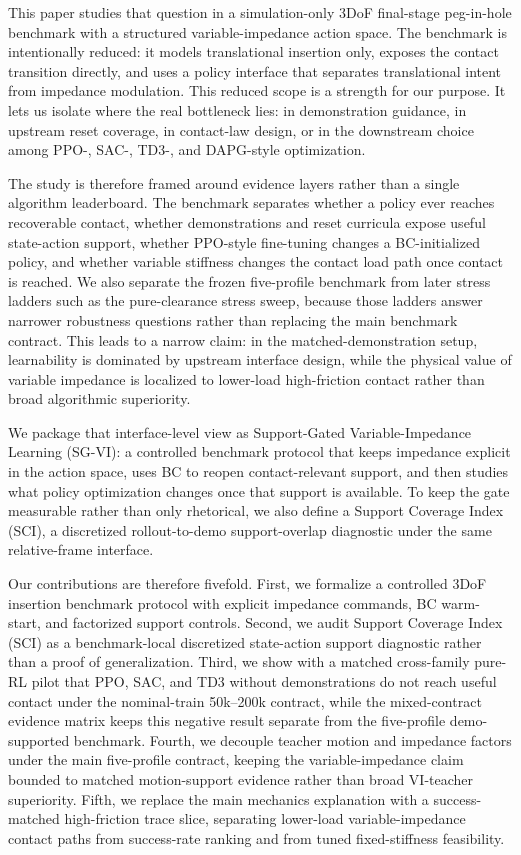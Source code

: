﻿\documentclass[11pt]{article}
\begin{document}
This paper studies that question in a simulation-only 3DoF final-stage peg-in-hole benchmark with
a structured variable-impedance action space. The benchmark is intentionally reduced: it models
translational insertion only, exposes the contact transition directly, and uses a policy interface
that separates translational intent from impedance modulation. This reduced scope is a strength for
our purpose. It lets us isolate where the real bottleneck lies: in demonstration guidance, in
upstream reset coverage, in contact-law design, or in the downstream choice among PPO-, SAC-,
TD3-, and DAPG-style optimization.

The study is therefore framed around evidence layers rather than a single algorithm leaderboard.
The benchmark separates whether a policy ever reaches recoverable contact, whether demonstrations
and reset curricula expose useful state-action support, whether PPO-style fine-tuning changes a
BC-initialized policy, and whether variable stiffness changes the contact load path once contact is
reached. We also separate the frozen five-profile benchmark from later stress ladders such as the
pure-clearance stress sweep, because those ladders answer narrower robustness questions rather
than replacing the main benchmark contract. This leads to a narrow claim: in the matched-demonstration setup, learnability is dominated by upstream interface design, while the physical
value of variable impedance is localized to lower-load high-friction contact rather than broad
algorithmic superiority.

We package that interface-level view as Support-Gated Variable-Impedance Learning (SG-VI): a
controlled benchmark protocol that keeps impedance explicit in the action space, uses BC to reopen
contact-relevant support, and then studies what policy optimization changes once that support is
available. To keep the gate measurable rather than only rhetorical, we also define a Support
Coverage Index (SCI), a discretized rollout-to-demo support-overlap diagnostic under the same
relative-frame interface.

Our contributions are therefore fivefold. First, we formalize a controlled 3DoF insertion benchmark protocol with explicit impedance commands, BC warm-start, and factorized support controls. Second, we audit Support Coverage Index (SCI) as a benchmark-local discretized state-action support diagnostic rather than a proof of generalization. Third, we show with a matched cross-family pure-RL pilot that PPO, SAC, and TD3 without demonstrations do not reach useful contact under the nominal-train 50k--200k contract, while the mixed-contract evidence matrix keeps this negative result separate from the five-profile demo-supported benchmark. Fourth, we decouple teacher motion and impedance factors under the main five-profile contract, keeping the variable-impedance claim bounded to matched motion-support evidence rather than broad VI-teacher superiority. Fifth, we replace the main mechanics explanation with a success-matched high-friction trace slice, separating lower-load variable-impedance contact paths from success-rate ranking and from tuned fixed-stiffness feasibility.
\end{document}
